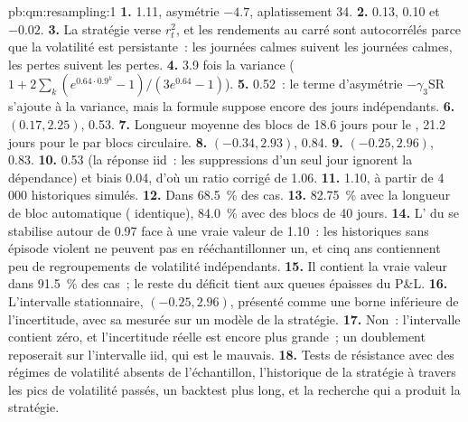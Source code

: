 \begin{solution}{pb:qm:resampling:1}
\textbf{1.}  1.11, asymétrie $-4.7$, aplatissement 34.
\textbf{2.} 0.13, 0.10 et $-0.02$.
\textbf{3.} La stratégie verse $r_t^2$, et les rendements au carré sont autocorrélés parce que la volatilité est persistante~: les journées calmes suivent les journées calmes,
les pertes suivent les pertes.
\textbf{4.} 3.9 fois la variance ($1 + 2\sum_k(e^{0.64 \cdot 0.9^k} - 1)/(3e^{0.64} - 1)$).
\textbf{5.} 0.52~: le terme d'asymétrie $-\gamma_3\mathrm{SR}$ s'ajoute à la variance, mais la formule suppose encore des jours indépendants.
\textbf{6.} $(0.17, 2.25)$,  0.53.
\textbf{7.} Longueur moyenne des blocs de 18.6 jours pour le , 21.2 jours pour le  par blocs circulaire.
\textbf{8.} $(-0.34, 2.93)$,  0.84.
\textbf{9.} $(-0.25, 2.96)$,  0.83.
\textbf{10.}  0.53 (la réponse iid~: les suppressions d'un seul jour ignorent la dépendance) et biais 0.04, d'où un ratio corrigé de 1.06.
\textbf{11.} 1.10, à partir de 4\,000 historiques simulés.
\textbf{12.} Dans 68.5~\% des cas.
\textbf{13.} 82.75~\% avec la longueur de bloc automatique ( identique), 84.0~\% avec des blocs de 40 jours.
\textbf{14.} L' du  se stabilise autour de 0.97 face à une vraie valeur de 1.10~: les historiques sans épisode violent ne peuvent pas en rééchantillonner
un, et cinq ans contiennent peu de regroupements de volatilité indépendants.
\textbf{15.} Il contient la vraie valeur dans 91.5~\% des cas~; le reste du déficit tient aux queues épaisses du P\&L.
\textbf{16.} L'intervalle stationnaire, $(-0.25, 2.96)$, présenté comme une borne inférieure de l'incertitude, avec sa  mesurée sur un modèle de
la stratégie.
\textbf{17.} Non~: l'intervalle contient zéro, et l'incertitude réelle est encore plus grande~; un doublement reposerait sur l'intervalle iid, qui est le
mauvais.
\textbf{18.} Tests de résistance avec des régimes de volatilité absents de l'échantillon, l'historique de la stratégie à travers les pics de volatilité passés, un
backtest plus long, et la recherche qui a produit la stratégie.

\end{solution}
